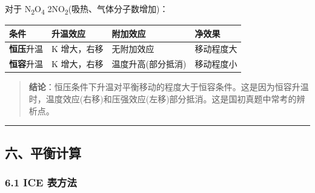 对于 N\textsubscript{2}O\textsubscript{4} \衡 2NO\textsubscript{2}(吸热、气体分子数增加)：

{\def\LTcaptype{none} %
\begin{longtable}[]{@{}
  >{\raggedright\arraybackslash}p{}
  >{\raggedright\arraybackslash}p{}
  >{\raggedright\arraybackslash}p{}
  >{\raggedright\arraybackslash}p{}@{}}
\toprule\noalign{}
\begin{minipage}[b]{\linewidth}\raggedright
条件
\end{minipage} & \begin{minipage}[b]{\linewidth}\raggedright
升温效应
\end{minipage} & \begin{minipage}[b]{\linewidth}\raggedright
附加效应
\end{minipage} & \begin{minipage}[b]{\linewidth}\raggedright
净效果
\end{minipage} \\
\midrule\noalign{}
\endhead
\bottomrule\noalign{}
\endlastfoot
\textbf{恒压}升温 & K 增大，右移 & 无附加效应 & 移动程度大 \\
\textbf{恒容}升温 & K 增大，右移 & 温度升高(部分抵消) & 移动程度小 \\
\end{longtable}
}

\begin{quote}
\textbf{结论}：恒压条件下升温对平衡移动的程度大于恒容条件。这是因为恒容升温时，温度效应(右移)和压强效应(左移)部分抵消。这是国初真题中常考的辨析点。
\end{quote}

\begin{center}\rule{0.5\linewidth}{0.5pt}\end{center}

\subsection{六、平衡计算}\label{ux516dux5e73ux8861ux8ba1ux7b97}

\subsubsection{6.1 ICE 表方法}\label{ice-ux8868ux65b9ux6cd5}


